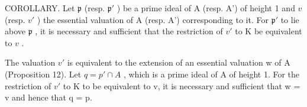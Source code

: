 COROLLARY. Let \(\mathfrak{p}\) (resp. \(\mathfrak{p}'\) ) be a prime ideal of A (resp. A') of height 1 and \(v\) (resp. \(v'\) ) the essential valuation of A (resp. A') corresponding to it. For \(\mathfrak{p}'\) to lie above \(\mathfrak{p}\) , it is necessary and sufficient that the restriction of \(v'\) to K be equivalent to \(v\) .

The valuation \(v'\) is equivalent to the extension of an essential valuation w of A (Proposition 12). Let \(q = p' \cap A\) , which is a prime ideal of A of height 1. For the restriction of \(v'\) to K to be equivalent to v, it is necessary and sufficient that w = v and hence that q = p.

